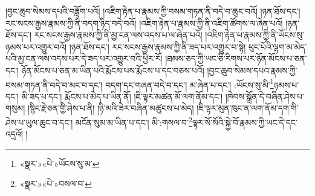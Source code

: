 །བྱང་ཆུབ་སེམས་དཔའི་བཟློག་པའོ། །འཇིག་རྟེན་པ་རྣམས་ཀྱི་བསམ་གཏན་ནི་བདེ་བ་ཆུང་བའོ། །ཉན་ཐོས་དང་། རང་སངས་རྒྱས་རྣམས་ཀྱི་ནི་བདག་ཉིད་བདེ་བའོ། །འཇིག་རྟེན་པ་རྣམས་ཀྱི་ནི་འཇིག་ཚོགས་ལ་ཞེན་པའོ། །ཉན་ཐོས་དང་། རང་སངས་རྒྱས་རྣམས་ཀྱི་ནི་མྱ་ངན་ལས་འདས་པ་ལ་ཞེན་པའོ། །འཇིག་རྟེན་པ་རྣམས་ཀྱི་ནི་ཡོངས་སུ་ཉམས་པར་འགྱུར་བའོ། །ཉན་ཐོས་དང་། རང་སངས་རྒྱས་རྣམས་ཀྱི་ནི་ཟད་པར་འགྱུར་བ་སྟེ། ཕུང་པོའི་ལྷག་མ་མེད་པའི་མྱ་ངན་ལས་འདས་པར་དེ་ཟད་པར་འགྱུར་བའི་ཕྱིར་རོ། །ཐམས་ཅད་ཀྱི་ཡང་ཅི་རིགས་པར་ཉོན་མོངས་པ་ཅན་དང་། ཉོན་མོངས་པ་ཅན་མ་ཡིན་པའི་རྨོངས་པས་རྨོངས་པ་དང་བཅས་པའོ། །བྱང་ཆུབ་སེམས་དཔའ་རྣམས་ཀྱི་བསམ་གཏན་ནི་བདེ་བ་མང་བ་དང་། བདག་དང་གཞན་བདེ་བ་དང་། མ་ཞེན་པ་དང་། :ཡོངས་སུ་མི་\footnote{«སྣར་»«པེ་»ཡོངས་སུ་མ་}ཉམས་པ་དང་། མི་ཟད་པ་དང་། རྨོངས་པ་མེད་པ་ཡིན་ནོ། །ཇི་ལྟར་མཚན་མོ་ལག་ནོམ་དང་། །ཁེབས་སྒྲོན་དེ་བཞིན་ཤེས་པ་གསུམ། །སྙིང་རྗེ་ཅན་གྱི་ཤེས་པ་ནི། །ཉི་མའི་ཟེར་བཞིན་མཚུངས་པ་མེད། །ཇི་ལྟར་མུན་ཁུང་ན་ལག་ནོམ་དག་གི་ཤེས་པ་ཡུལ་ཆུང་བ་དང་། མངོན་སུམ་མ་ཡིན་པ་དང་། མི་:གསལ་བ་\footnote{«སྣར་»«པེ་»བསལ་བ་}ལྟར་སོ་སོའི་སྐྱེ་བོ་རྣམས་ཀྱི་ཡང་དེ་དང་འདྲའོ། །
